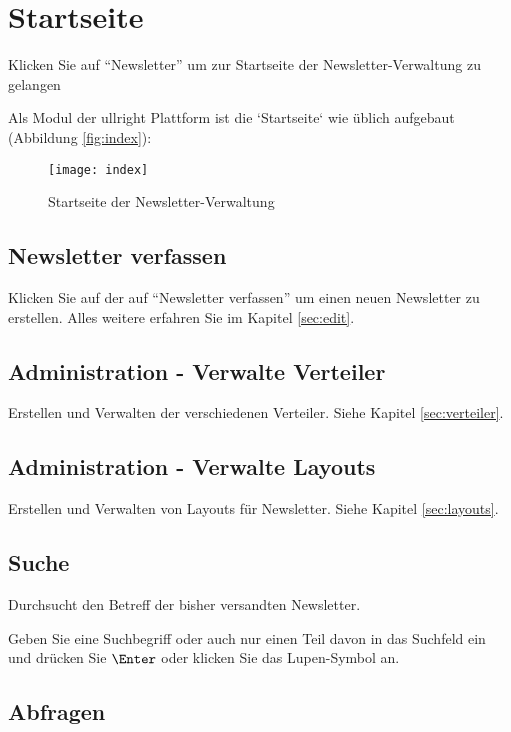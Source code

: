 \documentclass[article, a4paper, oneside, 11pt]{memoir}
\begin{document}
\chapter{Startseite}

Klicken Sie auf "`Newsletter"' um zur Startseite der Newsletter-Verwaltung zu gelangen

Als Modul der ullright Plattform ist die `Startseite` wie üblich aufgebaut (Abbildung \vref{fig:index}):

\begin{figure}[htp]
\centering
\texttt{[image: index]}
\caption{Startseite der Newsletter-Verwaltung}
\label{fig:index}
\end{figure}


\section{Newsletter verfassen}

Klicken Sie auf der auf "`Newsletter verfassen"' um einen neuen Newsletter zu erstellen. Alles weitere erfahren Sie im Kapitel \vref{sec:edit}.

\section{Administration - Verwalte Verteiler}

Erstellen und Verwalten der verschiedenen Verteiler. Siehe Kapitel \vref{sec:verteiler}. 

\section{Administration - Verwalte Layouts}

Erstellen und Verwalten von Layouts für Newsletter. Siehe Kapitel \vref{sec:layouts}. 


\section{Suche}

Durchsucht den Betreff der bisher versandten Newsletter.

Geben Sie eine Suchbegriff oder auch nur einen Teil davon in das Suchfeld ein und drücken Sie $\Enter$ oder klicken Sie das Lupen-Symbol an.

\section{Abfragen}
\end{document}
